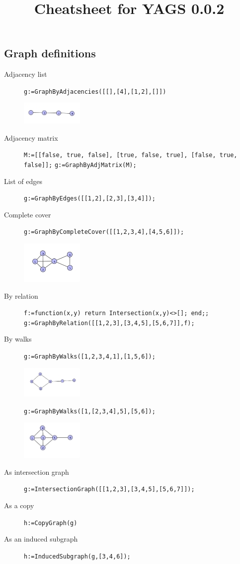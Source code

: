 \documentclass[11pt]{article}
\date{}
\title{Cheatsheet for YAGS 0.0.2}
\begin{document}
\maketitle
\begin{multicols}{3}
\scriptsize
\thispagestyle{empty}

\section{Graph definitions}
\label{sec:org0624c50}

\begin{description}
\item[{Adjacency list}] \texttt{g:=GraphByAdjacencies([[],[4],[1,2],[]])}

\includegraphics[width=3cm]{bylist.png}
\item[{Adjacency matrix}] \texttt{M:=[[false, true, false], [true, false, true], [false, true, false]];}
\texttt{g:=GraphByAdjMatrix(M);}
\item[{List of edges}] \texttt{g:=GraphByEdges([[1,2],[2,3],[3,4]]);}
\item[{Complete cover}] \texttt{g:=GraphByCompleteCover([[1,2,3,4],[4,5,6]]);}

\includegraphics[width=3cm]{bycomplete.png}
\item[{By relation}] \texttt{f:=function(x,y) return Intersection(x,y)<>[]; end;;}
\texttt{g:=GraphByRelation([[1,2,3],[3,4,5],[5,6,7]],f);}
\item[{By walks}] \texttt{g:=GraphByWalks([1,2,3,4,1],[1,5,6]);} 

\includegraphics[width=3cm]{bywalks.png}

\texttt{g:=GraphByWalks([1,[2,3,4],5],[5,6]);}

\includegraphics[width=3cm]{bywalks2.png}
\item[{As intersection graph}] \texttt{g:=IntersectionGraph([[1,2,3],[3,4,5],[5,6,7]]);}
\item[{As a copy}] \texttt{h:=CopyGraph(g)}
\item[{As an induced subgraph}] \texttt{h:=InducedSubgraph(g,[3,4,6]);}
\end{description}


\end{multicols}
\end{document}
